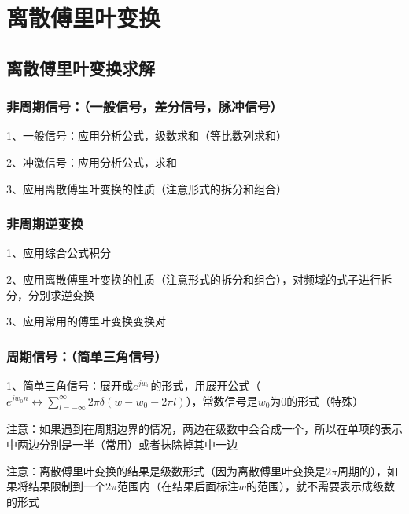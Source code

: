 \chapter{离散傅里叶变换}

\section{离散傅里叶变换求解}



\subsection{非周期信号：（一般信号，差分信号，脉冲信号）}

1、一般信号：应用分析公式，级数求和（等比数列求和）

2、冲激信号：应用分析公式，求和

3、应用离散傅里叶变换的性质（注意形式的拆分和组合）



\subsection{非周期逆变换}

1、应用综合公式积分

2、应用离散傅里叶变换的性质（注意形式的拆分和组合），对频域的式子进行拆分，分别求逆变换

3、应用常用的傅里叶变换变换对



\subsection{周期信号：（简单三角信号）}

1、简单三角信号：展开成$e^{jw_0}$的形式，用展开公式（$e^{jw_0n} \leftrightarrow \sum_{l=-\infty}^{\infty}2\pi \delta(w-w_0-2\pi l)$），常数信号是$w_0$为0的形式（特殊）

注意：如果遇到在周期边界的情况，两边在级数中会合成一个，所以在单项的表示中两边分别是一半（常用）或者抹除掉其中一边

注意：离散傅里叶变换的结果是级数形式（因为离散傅里叶变换是$2\pi$周期的），如果将结果限制到一个$2\pi$范围内（在结果后面标注$w$的范围），就不需要表示成级数的形式



